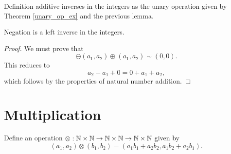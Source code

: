 \documentclass[../../math.tex]{subfiles}
\begin{document}
\begin{instance}
    Definition additive inverses in the integers as the unary operation given by
    Theorem \ref{unary_op_ex} and the previous lemma.
\end{instance}

\begin{instance}
    Negation is a left inverse in the integers.
\end{instance}
\begin{proof}
    We must prove that
    \[
        \ominus (a_1, a_2) \oplus (a_1, a_2) \sim (0, 0).
    \]
    This reduces to
    \[
        a_2 + a_1 + 0 = 0 + a_1 + a_2,
    \]
    which follows by the properties of natural number addition.
\end{proof}

\section{Multiplication}

\begin{definition}
    Define an operation $\otimes : \mathbb{N} \times \mathbb{N} \to \mathbb{N} \times \mathbb{N} \to \mathbb{N} \times
    \mathbb{N}$ given by
    \[
        (a_1, a_2) \otimes (b_1, b_2) = (a_1b_1 + a_2b_2, a_1b_2 + a_2b_1).
    \]
\end{definition}
\end{document}
